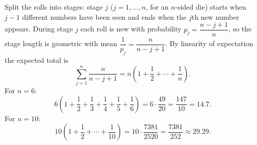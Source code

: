Split the rolls into stages: stage $j$ ($j=1,\dots,n$, for an $n$-sided die) starts when $j-1$ different numbers have been seen and ends when the $j$th new number appears. During stage $j$ each roll is new with probability $p_j=\dfrac{n-j+1}{n}$, so the stage length is geometric with mean $\dfrac{1}{p_j}=\dfrac{n}{n-j+1}$. By linearity of expectation the expected total is
\[
\sum_{j=1}^{n}\dfrac{n}{n-j+1}=n\left(1+\dfrac{1}{2}+\cdots+\dfrac{1}{n}\right).
\]
For $n=6$:
\[
6\left(1+\dfrac{1}{2}+\dfrac{1}{3}+\dfrac{1}{4}+\dfrac{1}{5}+\dfrac{1}{6}\right)=6\cdot\dfrac{49}{20}=\boxed{\dfrac{147}{10}=14.7}.
\]
For $n=10$:
\[
10\left(1+\dfrac{1}{2}+\cdots+\dfrac{1}{10}\right)=10\cdot\dfrac{7381}{2520}=\boxed{\dfrac{7381}{252}\approx29.29}.
\]

